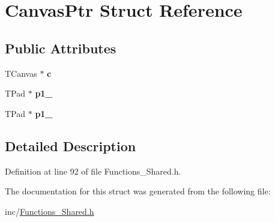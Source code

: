 \hypertarget{structCanvasPtr}{\section{Canvas\-Ptr Struct Reference}
\label{structCanvasPtr}
}
\subsection*{Public Attributes}
\begin{DoxyCompactItemize}
\item 
\hypertarget{structCanvasPtr_a43aa501c472e73caeb5c1c44d141c43a}{T\-Canvas $\ast$ {\bfseries c}}\label{structCanvasPtr_a43aa501c472e73caeb5c1c44d141c43a}

\item 
\hypertarget{structCanvasPtr_a6f9aae5eca044d2c731db354cb38c9c6}{T\-Pad $\ast$ {\bfseries p1\-\_}}\label{structCanvasPtr_a6f9aae5eca044d2c731db354cb38c9c6}

\item 
\hypertarget{structCanvasPtr_a49f2e1a75298107884977f77641e45f8}{T\-Pad $\ast$ {\bfseries p1\-\_}}\label{structCanvasPtr_a49f2e1a75298107884977f77641e45f8}

\end{DoxyCompactItemize}


\subsection{Detailed Description}


Definition at line 92 of file Functions\-\_\-\-Shared.\-h.



The documentation for this struct was generated from the following file\-:\begin{DoxyCompactItemize}
\item 
inc/\hyperlink{Functions__Shared_8h}{Functions\-\_\-\-Shared.\-h}\end{DoxyCompactItemize}
